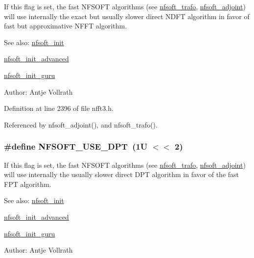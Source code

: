 If this flag is set, the fast NFSOFT algorithms (see \hyperlink{group__nfsoft_ge243cd75d7571a99eae53818e32355fb}{nfsoft\_\-trafo}, \hyperlink{group__nfsoft_g08395b1dd90f9a2565685d17460afc5b}{nfsoft\_\-adjoint}) will use internally the exact but usually slower direct NDFT algorithm in favor of fast but approximative NFFT algorithm. 

\begin{Desc}
\item[See also:]\hyperlink{group__nfsoft_g31c884458165fa204073c6c16c10775e}{nfsoft\_\-init} 

\hyperlink{group__nfsoft_gf4aec4ee2a2a5d56ca27c4f1a7f90b18}{nfsoft\_\-init\_\-advanced} 

\hyperlink{group__nfsoft_g1c13cdd3f82f48fa41acdd313cdc2052}{nfsoft\_\-init\_\-guru} \end{Desc}
\begin{Desc}
\item[Author:]Antje Vollrath \end{Desc}


Definition at line 2396 of file nfft3.h.

Referenced by nfsoft\_\-adjoint(), and nfsoft\_\-trafo().\hypertarget{group__nfsoft_g619b249b5d4b4675d2ce9a17d7817590}{
\subsubsection{\setlength{\rightskip}{0pt plus 5cm}\#define NFSOFT\_\-USE\_\-DPT~(1U $<$$<$ 2)}}
\label{group__nfsoft_g619b249b5d4b4675d2ce9a17d7817590}


If this flag is set, the fast NFSOFT algorithms (see \hyperlink{group__nfsoft_ge243cd75d7571a99eae53818e32355fb}{nfsoft\_\-trafo}, \hyperlink{group__nfsoft_g08395b1dd90f9a2565685d17460afc5b}{nfsoft\_\-adjoint}) will use internally the usually slower direct DPT algorithm in favor of the fast FPT algorithm. 

\begin{Desc}
\item[See also:]\hyperlink{group__nfsoft_g31c884458165fa204073c6c16c10775e}{nfsoft\_\-init} 

\hyperlink{group__nfsoft_gf4aec4ee2a2a5d56ca27c4f1a7f90b18}{nfsoft\_\-init\_\-advanced} 

\hyperlink{group__nfsoft_g1c13cdd3f82f48fa41acdd313cdc2052}{nfsoft\_\-init\_\-guru} \end{Desc}
\begin{Desc}
\item[Author:]Antje Vollrath \end{Desc}


